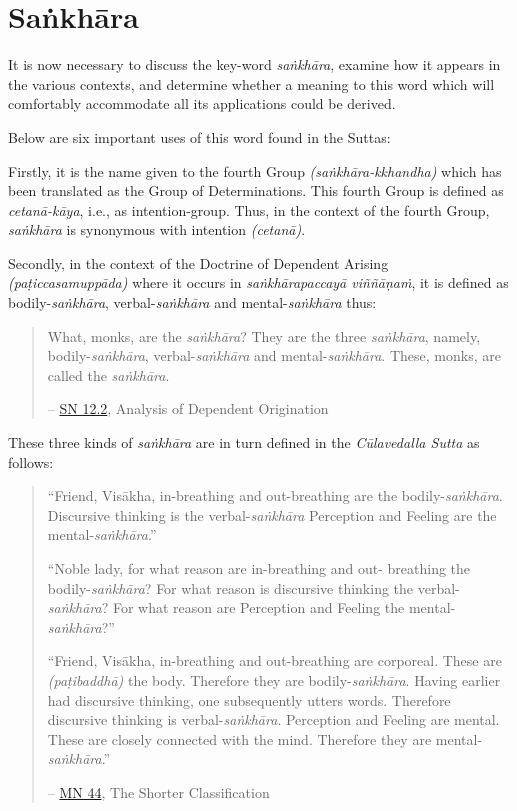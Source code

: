 \chapter{Saṅkhāra}

It is now necessary to discuss the key-word \emph{saṅkhāra}, examine how it appears in the various contexts, and determine whether a meaning to this word which will comfortably accommodate all its applications could be derived.

Below are six important uses of this word found in the Suttas:

Firstly, it is the name given to the fourth Group \emph{(saṅkhāra-kkhandha)} which has been translated as the Group of Determinations. This fourth Group is defined as \emph{cetanā-kāya}, i.e., as intention-group. Thus, in the context of the fourth Group, \emph{saṅkhāra} is synonymous with intention \emph{(cetanā)}.

Secondly, in the context of the Doctrine of Dependent Arising \emph{(paṭiccasamuppāda)} where it occurs in \emph{saṅkhārapaccayā viññāṇaṁ}, it is defined as bodily-\emph{saṅkhāra}, verbal-\emph{saṅkhāra} and mental-\emph{saṅkhāra} thus:

\enlargethispage*{\baselineskip}

\begin{quote}
What, monks, are the \emph{saṅkhāra}? They are the three \emph{saṅkhāra}, namely, bodily-\emph{saṅkhāra}, verbal-\emph{saṅkhāra} and mental-\emph{saṅkhāra}. These, monks, are called the \emph{saṅkhāra}.

 -- \href{https://suttacentral.net/sn12.2/en/bodhi}{SN 12.2}, Analysis of Dependent Origination
\end{quote}

These three kinds of \emph{saṅkhāra} are in turn defined in the \emph{Cūlavedalla Sutta} as follows:

\begin{quote}
``Friend, Visākha, in-breathing and out-breathing are the bodily-\emph{saṅkhāra}. Discursive thinking is the verbal-\emph{saṅkhāra} Perception and Feeling are the mental-\emph{saṅkhāra}.''

``Noble lady, for what reason are in-breathing and out- breathing the bodily-\emph{saṅkhāra}? For what reason is discursive thinking the verbal-\emph{saṅkhāra}? For what reason are Perception and Feeling the mental-\emph{saṅkhāra}?''

``Friend, Visākha, in-breathing and out-breathing are corporeal. These are  \emph{(paṭibaddhā)} the body. Therefore they are bodily-\emph{saṅkhāra}. Having earlier had discursive thinking, one subsequently utters words. Therefore discursive thinking is verbal-\emph{saṅkhāra}. Perception and Feeling are mental. These are closely connected with the mind. Therefore they are mental-\emph{saṅkhāra}.''

 -- \href{https://suttacentral.net/mn44/en/sujato}{MN 44}, The Shorter Classification
\end{quote}

